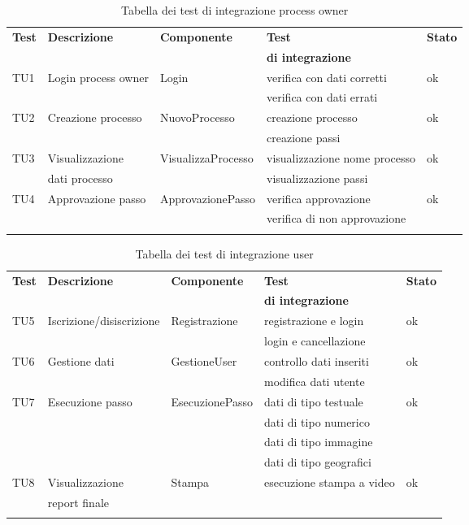 \begin{longtable}{lllll}
\toprule
\textbf{Test} & \textbf{Descrizione} & \textbf{Componente} & \textbf{Test} & \textbf{Stato}\\
&&&\textbf{di integrazione}&\\
\toprule
TU1& Login process owner &Login & verifica con dati corretti&ok\\
&&&verifica con dati errati&\\
\midrule
TU2& Creazione processo&NuovoProcesso&creazione processo&ok\\
&&&creazione passi&\\
\midrule
TU3& Visualizzazione&VisualizzaProcesso&visualizzazione nome processo&ok\\
&dati processo&&visualizzazione passi&\\
\midrule
TU4& Approvazione passo&ApprovazionePasso&verifica approvazione&ok\\
&&&verifica di non approvazione&\\
\bottomrule
\caption{Tabella dei test di integrazione process owner}
\end{longtable}

\begin{longtable}{lllll}
\toprule
\textbf{Test} & \textbf{Descrizione} & \textbf{Componente} & \textbf{Test} & \textbf{Stato}\\
&&&\textbf{di integrazione}&\\
\toprule
TU5& Iscrizione/disiscrizione&Registrazione&registrazione e login&ok\\
&&&login e cancellazione&\\
\midrule
TU6& Gestione dati&GestioneUser&controllo dati inseriti&ok\\
&&&modifica dati utente&\\
\midrule
TU7& Esecuzione passo&EsecuzionePasso&dati di tipo testuale&ok\\
&&&dati di tipo numerico&\\
&&&dati di tipo immagine&\\
&&&dati di tipo geografici&\\
\midrule
TU8& Visualizzazione &Stampa&esecuzione stampa a video&ok\\
&report finale&&&\\
\bottomrule
\caption{Tabella dei test di integrazione user}
\end{longtable}